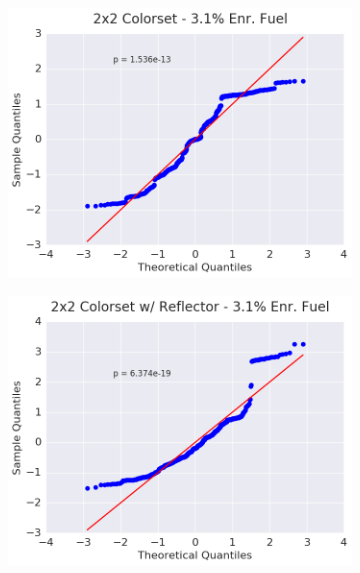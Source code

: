 \begin{figure}[h!]
\begin{subfigure}{0.5\textwidth}
  \centering
  \includegraphics[width=\linewidth]{figures/patterns/2x2/quantile/31-enr-fiss-2}
  \caption{}
  \label{fig:chap9-qq-2x2-3.1-fiss}
\end{subfigure}%
\begin{subfigure}{0.5\textwidth}
  \centering
  \includegraphics[width=\linewidth]{figures/patterns/reflector/quantile/31-enr-fiss-2}  \caption{}
  \label{fig:chap9-qq-reflector-3.1-fiss}
\end{subfigure}
\begin{subfigure}{0.5\textwidth}
  \centering

\end{subfigure}
\end{figure}
